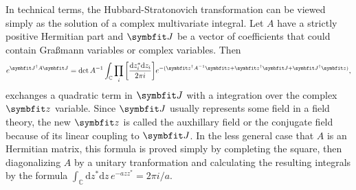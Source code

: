 In technical terms, the Hubbard-Stratonovich transformation can be viewed simply as the solution of a complex multivariate integral.
Let $A$ have a strictly positive Hermitian part and $\v{J}$ be a vector of
coefficients that could contain Gra\ss mann variables or complex variables. Then
\begin{equation}
    \label{eq:Field:HS:complexIntegral}
    e^{\v{J}^\dagger A \v{J}} = \det A^{-1}\int_{\mathbb{C}}\prod_{i}\bigg[\frac{\mathrm{d}z_i^\ast\mathrm{d}z_i}{2\pi i}\bigg]e^{-(\v{z}^\dagger A^{-1}\v{z} + \v{z}^\dagger \v{J} + \v{J}^\dagger\v{z})},
\end{equation}
exchanges a quadratic term in $\v{J}$ with a integration over the complex $\v{z}$ variable.
Since $\v{J}$ usually represents some field in a field theory, the new $\v{z}$ is called the auxhillary field or the conjugate
field because of its linear coupling to $\v{J}$.
In the less general case that $A$ is an Hermitian matrix, this formula is proved simply by completing the square, then
diagonalizing $A$ by a unitary tranformation and calculating the resulting integrals by the formula 
$\int_{\mathbb{C}}\!\mathrm{d}z^\ast\mathrm{d}z\,e^{-azz^\ast} = 2\pi i /a$. 

